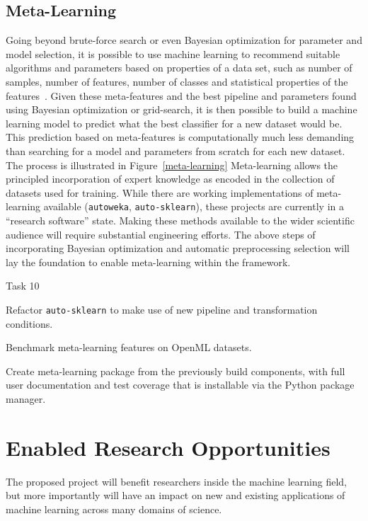 \subsection{Meta-Learning}
Going beyond brute-force search or even Bayesian optimization for parameter and
model selection, it is possible to use machine learning to recommend suitable
algorithms and parameters based on properties of a data set, such as number of
samples, number of features, number of classes and statistical properties of
the features~\autocite{luo2015review, feurer-nips2015}.
Given these meta-features and the best pipeline and parameters found using
Bayesian optimization or grid-search, it is then possible to build a machine
learning model to predict what the best classifier for a new dataset would be.
This prediction based on meta-features is computationally much less demanding
than searching for a model and parameters from scratch for each new dataset. The process
is illustrated in Figure~\ref{meta-learning}
Meta-learning allows the principled incorporation of expert knowledge as encoded
in the collection of datasets used for training.
While there are working implementations of meta-learning available
(\texttt{autoweka}, \texttt{auto-sklearn}),
these projects are currently in a ``research software'' state. Making these methods
available to the wider scientific audience will require substantial engineering
efforts. The above steps of incorporating Bayesian optimization and automatic
preprocessing selection will lay the foundation to enable meta-learning within the
\sklearn{} framework.
\begin{labeling}{Task 10}
    \item [Task 10] Refactor \texttt{auto-sklearn} to make use of new pipeline and transformation conditions.
    \item [Task 11] Benchmark meta-learning features on OpenML datasets.
    \item [Task 12] Create meta-learning package from the previously build
        components, with full user documentation and test coverage that is
        installable via the Python package manager.
\end{labeling}

\section{Enabled Research Opportunities}
The proposed project will benefit researchers inside the machine learning field,
but more importantly will have an impact on new and existing applications of machine
learning across many domains of science.

